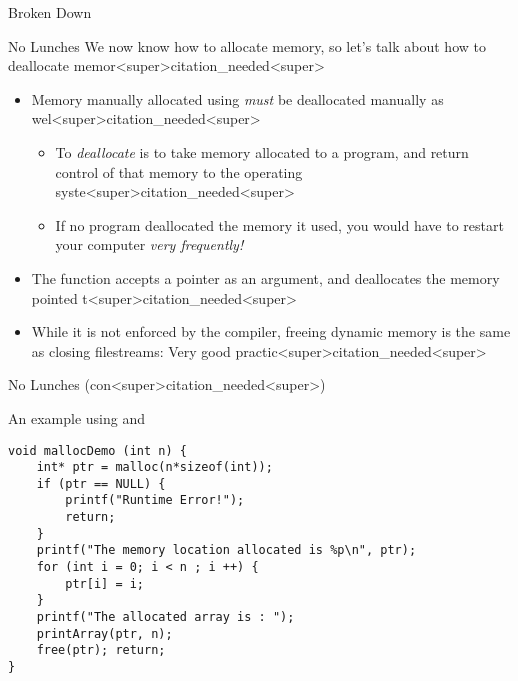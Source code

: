\documentclass[11pt]{beamer}
\let\OldTexttt\texttt
\renewcommand{\texttt}[1]{\OldTexttt{\color{teal}{#1}}}
\begin{document}
\begin{frame}{\texttt{malloc()} Broken Down}
\center
\
\end{frame}

\begin{frame}{No \texttt{free()} Lunches}
We now know how to allocate memory, so let's talk about how to deallocate memor<super>citation_needed<super>
\begin{itemize}
\item Memory manually allocated using \texttt{malloc()} \emph{must} be deallocated manually as wel<super>citation_needed<super>
\begin{itemize}
	\item To \textit{deallocate} is to take memory allocated to a program, and return control of that memory to the operating syste<super>citation_needed<super>  
	\item If no program deallocated the memory it used, you would have to restart your computer \emph{very frequently!}
\end{itemize}
\item The \texttt{free()} function accepts a pointer as an argument, and deallocates the memory pointed t<super>citation_needed<super>
\item While it is not enforced by the compiler, freeing dynamic memory is the same as closing filestreams: Very good practic<super>citation_needed<super>  
\end{itemize}
\end{frame}

\begin{frame}{No \texttt{free()} Lunches (con<super>citation_needed<super>)}
\center
\
\end{frame}

\begin{frame}[fragile=singleslide]{An example using \texttt{malloc()} and \texttt{free()}}
\begin{lstlisting}[style = C]
void mallocDemo (int n) {
	int* ptr = malloc(n*sizeof(int));
	if (ptr == NULL) {
		printf("Runtime Error!"); 
		return; 
	}
	printf("The memory location allocated is %p\n", ptr);
	for (int i = 0; i < n ; i ++) { 
		ptr[i] = i; 
	}
	printf("The allocated array is : ");
	printArray(ptr, n);
	free(ptr); return;
}
\end{lstlisting}
\end{frame}
\end{document}
